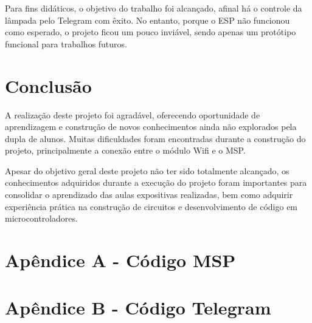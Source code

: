 \documentclass[12pt,journal,compsoc]{IEEEtran}
\begin{document}
Para fins didáticos, o objetivo do trabalho foi alcançado, afinal há o controle da lâmpada pelo Telegram com êxito. No entanto, porque o ESP não funcionou como esperado, o projeto ficou um pouco inviável, sendo apenas um protótipo funcional para trabalhos futuros.


\section{Conclusão}
A realização deste projeto foi agradável, oferecendo oportunidade de aprendizagem e construção de novos conhecimentos ainda não explorados pela dupla de alunos. Muitas dificuldades foram encontradas durante a construção do projeto, principalmente a conexão entre o módulo Wifi e o MSP.

Apesar do objetivo geral deste projeto não ter sido totalmente alcançado, os conhecimentos adquiridos durante a execução do projeto foram importantes para consolidar o aprendizado das aulas expositivas realizadas, bem como adquirir experiência prática na construção de circuitos e desenvolvimento de código em microcontroladores.

\section*{Apêndice A - Código MSP}



\section*{Apêndice B - Código Telegram}





\end{document}
